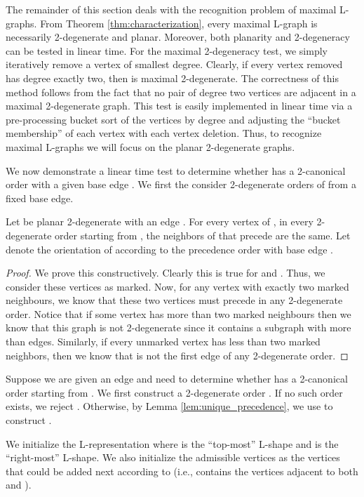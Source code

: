 \documentclass{llncs}
\begin{document}
The remainder of this section deals with the recognition problem of maximal L-graphs. 
From Theorem \ref{thm:characterization}, every maximal L-graph is necessarily 2-degenerate and planar. Moreover, both planarity \cite{Hopcroft1974} and 2-degeneracy can be tested in linear time. 
For the maximal 2-degeneracy test, we simply iteratively remove a vertex of smallest degree. Clearly, if every vertex removed has degree exactly two, then  is maximal 2-degenerate. 
The correctness of this method follows from the fact that no pair of degree two vertices are adjacent in a maximal 2-degenerate graph. 
This test is easily implemented in linear time via a pre-processing bucket sort of the vertices by degree and adjusting the ``bucket membership'' of each vertex with each vertex deletion. 
Thus, to recognize maximal L-graphs we will focus on the planar 2-degenerate graphs.






We now demonstrate a linear time test to determine whether  has a 2-canonical order with a given base edge . We first the consider 2-degenerate orders of  from a fixed base edge.

\begin{lemma}\label{lem:unique_precedence}
Let  be planar 2-degenerate with an edge . For every vertex  of , in every 2-degenerate order starting from , the neighbors of  that precede  are the same. Let  denote the orientation of  according to the precedence order with base edge . 
\end{lemma}
\begin{proof}
We prove this constructively. Clearly this is true for  and . Thus, we consider these vertices as marked. Now, for any vertex  with exactly two marked neighbours, we know that these two vertices must precede  in any 2-degenerate order. Notice that if some vertex has more than two marked neighbours then we know that this graph is not 2-degenerate since it contains a subgraph  with more than  edges. Similarly, if every unmarked vertex has less than two marked neighbors, then we know that  is not the first edge of any 2-degenerate order. 
\end{proof}

Suppose we are given an edge  and need to determine whether  has a 2-canonical order starting from . We first construct a 2-degenerate order . If no such order exists, we reject . Otherwise, by Lemma \ref{lem:unique_precedence}, we use  to construct . 

We initialize the L-representation  where  is the ``top-most'' L-shape and  is the ``right-most'' L-shape. We also initialize the admissible vertices  as the vertices that could be added next according to  (i.e.,  contains the vertices adjacent to both  and ). 
\end{document}
